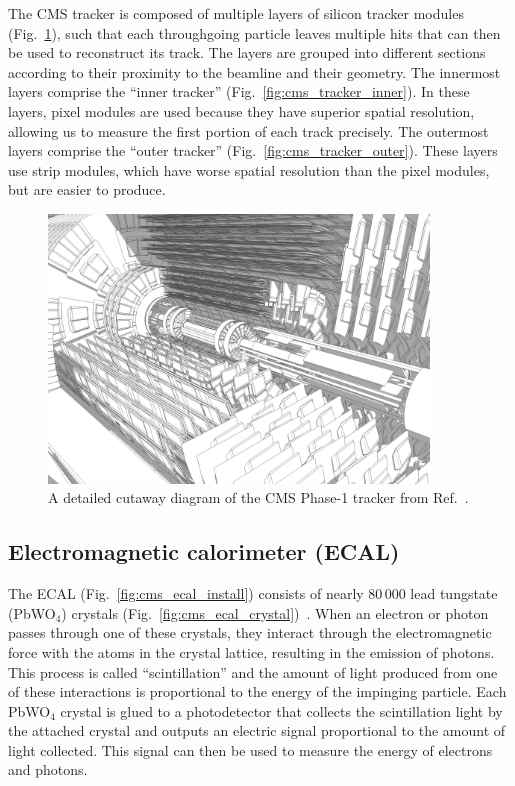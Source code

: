 The CMS tracker is composed of multiple layers of silicon tracker modules (Fig.~\ref{fig:cms_tracker_layout}), such that each throughgoing particle leaves multiple hits that can then be used to reconstruct its track. 
The layers are grouped into different sections according to their proximity to the beamline and their geometry. 
The innermost layers comprise the ``inner tracker'' (Fig.~\ref{fig:cms_tracker_inner}). 
In these layers, pixel modules are used because they have superior spatial resolution, allowing us to measure the first portion of each track precisely. 
The outermost layers comprise the ``outer tracker'' (Fig.~\ref{fig:cms_tracker_outer}). 
These layers use strip modules, which have worse spatial resolution than the pixel modules, but are easier to produce. 

\begin{figure}[htb]
    \centering
    \includegraphics[width=0.9\textwidth,valign=c]{fig/cms/tracker_detailed.png}
    \caption[A detailed cutaway diagram of the CMS Phase-1 tracker.]{
        A detailed cutaway diagram of the CMS Phase-1 tracker from Ref.~\cite{Sakuma:2630160}. 
    }
    \label{fig:cms_tracker_layout}
\end{figure}

\subsection{Electromagnetic calorimeter (ECAL)}
The ECAL (Fig.~\ref{fig:cms_ecal_install}) consists of nearly 80\,000 lead tungstate (PbWO$_4$) crystals\footnotemark{} (Fig.~\ref{fig:cms_ecal_crystal})~\cite{CMSWebECAL}. 
When an electron or photon passes through one of these crystals, they interact through the electromagnetic force with the atoms in the crystal lattice, resulting in the emission of photons. 
This process is called ``scintillation'' and the amount of light produced from one of these interactions is proportional to the energy of the impinging particle. 
Each PbWO$_4$ crystal is glued to a photodetector that collects the scintillation light by the attached crystal and outputs an electric signal proportional to the amount of light collected. 
This signal can then be used to measure the energy of electrons and photons. 

